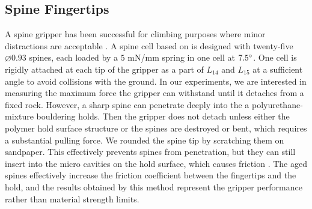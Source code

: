 \documentclass[letterpaper, 10 pt, conference]{ieeeconf}  %
\begin{document}



\subsection{Spine Fingertips}
A spine gripper has been successful for climbing purposes where minor distractions are acceptable \cite{climb_yuki}. 
A spine cell based on \cite{spine_cell} is designed with twenty-five $\diameter 0.93$ spines, each loaded by a $5$ mN/mm spring in one cell at $7.5 \degree$. One cell is rigidly attached at each tip of the gripper as a part of $L_{14}$ and $L_{15}$ at a sufficient angle to avoid collisions with the ground. 
In our experiments, we are interested in measuring the maximum force the gripper can withstand until it detaches from a fixed rock.
However, a sharp spine can penetrate deeply into the a polyurethane-mixture bouldering holds. Then the gripper does not detach unless either the polymer hold surface structure or the spines are destroyed or bent, which requires a substantial pulling force. We rounded the spine tip by scratching them on sandpaper. This effectively prevents spines from penetration, but they can still insert into the micro cavities on the hold surface, which causes friction \cite{climb_yuki}.%
 The aged spines effectively increase the friction coefficient between the fingertips and the hold, and the results obtained by this method represent the gripper performance rather than material strength limits.
\end{document}
